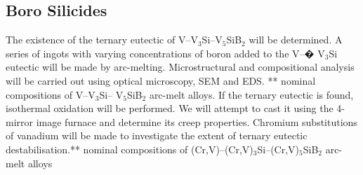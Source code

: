 \subsection{Boro Silicides}
The existence of the ternary eutectic of V--V$_3$Si--V$_5$SiB$_2$ will be determined. A series of ingots with varying concentrations of boron added to the V--� V$_3$Si eutectic will be made by arc-melting. Microstructural and compositional analysis will be carried out using optical microscopy, SEM and EDS. ** nominal compositions of V--V$_3$Si-- V$_5$SiB$_2$ arc-melt alloys. If the ternary eutectic is found, isothermal oxidation will be performed. We will attempt to cast it using the 4-mirror image furnace and determine its creep properties. Chromium substitutions of vanadium will be made to investigate the extent of ternary eutectic destabilisation.** nominal compositions of (Cr,V)--(Cr,V)$_3$Si--(Cr,V)$_5$SiB$_2$ arc-melt alloys


